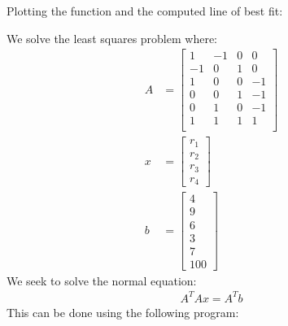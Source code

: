 \documentclass{article}
\begin{document}
Plotting the function and the computed line of best fit:
\begin{center}
\end{center}

\clearpage
\problem{}
We solve the least squares problem where:
\begin{align*}
    A & = \begin{bmatrix}
        1 & -1 & 0 & 0 \\
        -1 & 0 & 1 & 0 \\
        1 & 0 & 0 & -1 \\
        0 & 0 & 1 & -1 \\
        0 & 1 & 0 & -1 \\
        1 & 1 & 1 & 1 \\
    \end{bmatrix} \\
    x & = \begin{bmatrix}
        r_1 \\ r_2 \\ r_3 \\ r_4
    \end{bmatrix} \\
    b & = \begin{bmatrix}
        4 \\ 9 \\ 6 \\ 3 \\ 7 \\ 100
    \end{bmatrix}
\end{align*}
We seek to solve the normal equation:
\begin{align*}
    A^T A x = A^T b
\end{align*}
This can be done using the following program:
\end{document}
